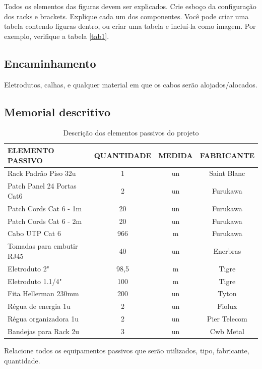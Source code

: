 \documentclass[	DIV=calc,%
							paper=a4,%
							fontsize=12pt,%
							onecolumn]{scrartcl}	 					%
\begin{document}
Todos os elementos das figuras devem ser explicados. 
Crie esboço da configuração dos racks e brackets. Explique cada um dos componentes. Você pode criar uma tabela contendo figuras dentro, ou criar uma tabela e incluí-la como imagem. Por exemplo, verifique a tabela \ref{tab1}.



\subsection{Encaminhamento}
Eletrodutos, calhas, e qualquer material em que os cabos serão alojados/alocados.

\subsection{Memorial descritivo}
\begin{table}[]
	\centering
	\caption{Descrição dos elementos passivos do projeto}
	\label{tab_passivos}
	\begin{tabular}{|l|c|c|c|}
		\hline
		\textbf{ELEMENTO PASSIVO}  & \textbf{QUANTIDADE} & \textbf{MEDIDA} & \textbf{FABRICANTE} \\ \hline
		Rack Padrão Piso 32u       & 1                   & un              & Saint Blanc         \\ \hline
		Patch Panel 24 Portas Cat6 & 2                   & un              & Furukawa            \\ \hline
		Patch Cords Cat 6 - 1m     & 20                  & un              & Furukawa            \\ \hline
		Patch Cords Cat 6 - 2m     & 20                  & un              & Furukawa            \\ \hline
		Cabo UTP Cat 6             & 966                 & m               & Furukawa            \\ \hline
		Tomadas para embutir RJ45  & 40                  & un              & Enerbras            \\ \hline
		Eletroduto 2"              & 98,5                & m               & Tigre               \\ \hline
		Eletroduto 1.1/4"          & 100                 & m               & Tigre               \\ \hline
		Fita Hellerman 230mm       & 200                 & un              & Tyton               \\ \hline
		Régua de energia 1u        & 2                   & un              & Fiolux              \\ \hline
		Régua organizadora 1u      & 2                   & un              & Pier Telecom        \\ \hline
		Bandejas para Rack 2u      & 3                   & un              & Cwb Metal           \\ \hline
	\end{tabular}
\end{table}
Relacione todos os equipamentos passivos que serão utilizados, tipo, fabricante, quantidade.
\end{document}
